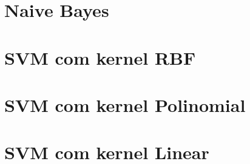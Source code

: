   
  
  
  
  
  
  
\section{Naive Bayes}

\section{SVM com kernel RBF}

\section{SVM com kernel Polinomial}

\section{SVM com kernel Linear}
